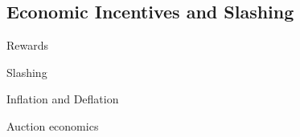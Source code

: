 \subsection{Economic Incentives and Slashing}\label{sec:economics}

Rewards

Slashing

Inflation and Deflation

Auction economics
